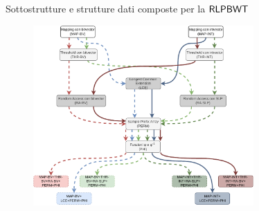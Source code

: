 \documentclass[]{beamer}
\def\SLP{\mbox{\rm {\sf SLP}}}
\def\rank{\mbox{\rm {\sf rank}}}
\def\LCE{\mbox{\rm {\sf LCE}}}
\def\PBWT{\mbox{\rm {\sf PBWT}}}
\def\RLPBWT{\mbox{\rm {\sf RLPBWT}}}
\def\LCE{\mbox{\rm {\sf LCE}}}
\begin{document}
\begin{frame}{Sottostrutture e strutture dati composte per la $\RLPBWT$}
  \begin{figure}[H]
    \centering
    \includegraphics[width=0.75\textwidth]{img/ds2.pdf}
  \end{figure}
\end{frame}
\end{document}
